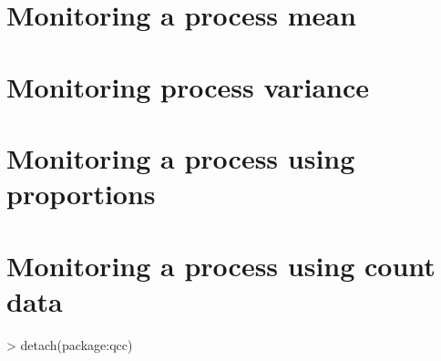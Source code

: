 \section{Monitoring a process mean} 
 
\section{Monitoring process variance} 
 
\section{Monitoring a process using proportions} 
 
 
\section{Monitoring a process using count data} 
 
\begin{Schunk}
\begin{Sinput}
> detach(package:qcc) 
\end{Sinput}
\end{Schunk}

